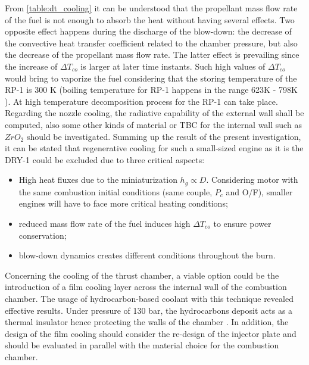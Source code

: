 From \autoref{table:dt_cooling} it can be understood that the propellant mass flow rate of the fuel is not enough to absorb the heat without having several effects. Two opposite effect happens during the discharge of the blow-down: the decrease of the convective heat transfer coefficient related to the chamber pressure, but also the decrease of the propellant mass flow rate. The latter effect is prevailing since the increase of $\Delta T_{co}$ is larger at later time instants. Such high values of $\Delta T_{co}$ would bring to vaporize the fuel considering that the storing temperature of the RP-1 is 300 K (boiling temperature for RP-1 happens in the range 623K - 798K \cite{rp_1_temp}). At high temperature decomposition process for the RP-1 can take place. Regarding the nozzle cooling, the radiative capability of the external wall shall be computed, also some other kinds of material or TBC for the internal wall such as $ZrO_2$  should be investigated. Summing up the result of the present investigation, it can be stated that regenerative cooling for such a small-sized engine as it is the DRY-1 could be excluded due to three critical aspects:
\begin{itemize}
    \item High heat fluxes due to the miniaturization $h_g \propto D$. Considering motor with the same combustion initial conditions (same couple, $P_c$ and O/F), smaller engines will have to face more critical heating conditions;
    \item reduced mass flow rate of the fuel induces high $\Delta T_{co}$ to ensure power conservation;
    \item blow-down dynamics creates different conditions throughout the burn.
\end{itemize}

Concerning the cooling of the thrust chamber, a viable option could be the introduction of a film cooling layer across the internal wall of the combustion chamber. The usage of hydrocarbon-based coolant with this technique revealed effective results. Under pressure of 130 bar, the hydrocarbons deposit acts as a thermal insulator hence protecting the walls of the chamber \cite{huzel_huang}. In addition, the design of the film cooling should consider the re-design of the injector plate and should be evaluated in parallel with the material choice for the combustion chamber. 

